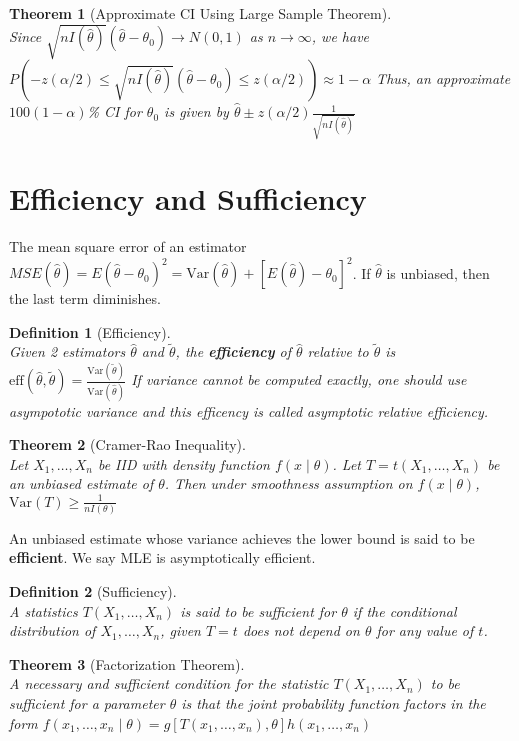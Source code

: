 \documentclass[12pt]{article}
\newcommand{\var}{\mathrm{Var}}
\newtheorem{definition}{Definition}[section]
\newtheorem{theorem}{Theorem}[section]
\theoremstyle{definition}
\begin{document}
\begin{theorem}[Approximate CI Using Large Sample Theorem]
\hfill\\\normalfont Since $\sqrt{nI(\hat{\theta})}(\hat{\theta}-\theta_0)\to N(0,1)$ as $n\to\infty$, we have
$
P(-z(\alpha/2)\leq \sqrt{nI(\hat{\theta})}(\hat{\theta}-\theta_0)\leq z(\alpha/2))\approx 1-\alpha
$
Thus, an \textit{approximate} $100(1-\alpha)$\% CI for $\theta_0$ is given by
$
\hat{\theta}\pm z(\alpha/2)\frac{1}{\sqrt{nI(\hat{\theta})}}
$
\end{theorem}

\section{Efficiency and Sufficiency}
The mean square error of an estimator $MSE(\hat{\theta})=E(\hat{\theta}-\theta_0)^2=\var(\hat{\theta})+[E(\hat{\theta})-\theta_0]^2$. If $\hat{\theta}$ is unbiased, then the last term diminishes.
\begin{definition}[Efficiency]
\hfill\\\normalfont Given 2 estimators $\hat{\theta}$ and $\tilde{\theta}$, the \textbf{efficiency} of $\hat{\theta}$ relative to $\tilde{\theta}$ is
$
\text{eff}(\hat{\theta},\tilde{\theta})=\frac{\var(\tilde{\theta})}{\var(\hat{\theta})}
$
If variance cannot be computed exactly, one should use asympototic variance and this efficency is called asymptotic relative efficiency.
\end{definition}
\begin{theorem}[Cramer-Rao Inequality]
\hfill\\\normalfont Let $X_1,\ldots, X_n$ be IID with density function $f(x\mid \theta)$. Let $T=t(X_1,\ldots, X_n)$ be an unbiased estimate of $\theta$. Then under smoothness assumption on $f(x\mid \theta)$,
$
\var(T)\geq \frac{1}{nI(\theta)}
$
\end{theorem}
An unbiased estimate whose variance achieves the lower bound is said to be \textbf{efficient}. We say MLE is asymptotically efficient.
\begin{definition}[Sufficiency]
\hfill\\\normalfont A statistics $T(X_1,\ldots, X_n)$ is said to be sufficient for $\theta$ if the conditional distribution of $X_1,\ldots, X_n$, given $T=t$ does not depend on $\theta$ for any value of $t$.
\end{definition}
\begin{theorem}[Factorization Theorem]
\hfill\\\normalfont A necessary and sufficient condition for the statistic $T(X_1,\ldots, X_n)$ to be sufficient for a parameter $\theta$ is that the joint probability function factors in the form
$
f(x_1,\ldots, x_n\mid \theta)=g[T(x_1,\ldots, x_n),\theta]h(x_1,\ldots, x_n)
$
\end{theorem}
\end{document}
